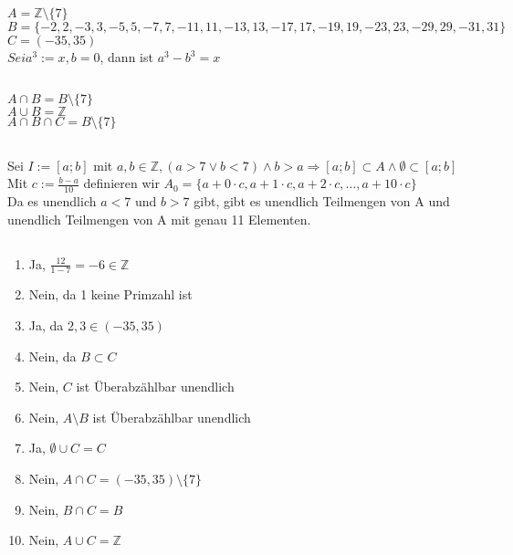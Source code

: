 \documentclass{article}
\begin{document}
    \section{}
    \subsection{}
    $A = \mathbb{Z}\setminus \{7\}$\\
    $B = \{-2, 2, -3, 3, -5, 5, -7, 7, -11, 11, -13, 13, -17, 17, -19, 19, -23, 23, -29, 29, -31, 31\}$\\
    $C = (-35, 35)$\\
    $Sei a^3:=x, b=0$, dann ist $a^3-b^3=x$
    \subsection{}
    $A\cap B = B\setminus \{7\}$\\
    $A\cup B = \mathbb{Z}$\\
    $A\cap B \cap C = B\setminus\{7\}$
    \subsection{}
    Sei $I:=[a;b]$ mit $a,b \in \mathbb{Z}, (a>7\lor b<7)\land b>a \Rightarrow [a;b] \subset A \land \emptyset \subset [a;b]$\\
    Mit $c := \frac{b-a}{10}$ definieren wir $A_0 = \{a+ 0\cdot c, a + 1 \cdot c, a + 2\cdot c, \hdots, a + 10\cdot c\}$\\
    Da es unendlich $a<7$ und $b > 7$ gibt, gibt es unendlich Teilmengen von A 
    und unendlich Teilmengen von A mit genau 11 Elementen.
    \subsection{}
    \begin{enumerate}
        \item{Ja, $\frac{12}{1-7}=-6\in\mathbb Z$}
        \item{Nein, da 1 keine Primzahl ist}
        \item{Ja, da $2,3 \in (-35, 35)$}
        \item{Nein, da $B \subset C$}
        \item{Nein, $C$ ist Überabzählbar unendlich}
        \item{Nein, $A\setminus B$ ist Überabzählbar unendlich}
        \item{Ja, $\emptyset \cup C = C$}
        \item{Nein, $A \cap C = (-35, 35)\setminus \{7\}$}
        \item{Nein, $B\cap C = B$}
        \item{Nein, $A \cup C = \mathbb Z$}
    \end{enumerate}
\end{document}
